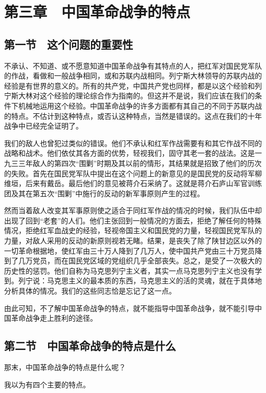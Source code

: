 \section{第三章　中国革命战争的特点}

\subsection{第一节　这个问题的重要性}

不承认、不知道、或不愿意知道中国革命战争有其特点的人，把红军对国民党军队的作战，看做和一般战争相同，或和苏联内战相同。列宁斯大林领导的苏联内战的经验是有世界的意义的。所有的共产党，中国共产党也同样，都是以这个经验和列宁斯大林对这个经验的理论综合作为指南的。但这并不是说，我们应该在我们的条件下机械地运用这个经验。中国革命战争的许多方面都有其自己的不同于苏联内战的特点。不估计到这种特点，或否认这种特点，当然是错误的。这点在我们的十年战争中已经完全证明了。

我们的敌人也曾犯过类似的错误。他们不承认和红军作战需要有和其它作战不同的战略和战术。他们依仗其各方面的优势，轻视我们，固守其老一套的战法。这是一九三三年敌人的第四次“围剿”时期及其以前的情形，其结果就是招致了他们的历次的失败。首先在国民党军队中提出在这个问题上的新意见的是国民党的反动将军柳维垣，后来有戴岳。最后他们的意见被蒋介石采纳了。这就是蒋介石庐山军官训练团及其在第五次“围剿”中施行的反动的新军事原则产生的过程。

然而当着敌人改变其军事原则使之适合于同红军作战的情况的时候，我们队伍中却出现了回到“老套”的人们。他们主张回到一般情况的方面去，拒绝了解任何的特殊情况，拒绝红军血战史的经验，轻视帝国主义和国民党的力量，轻视国民党军队的力量，对敌人采用的反动的新原则视若无睹。结果，是丧失了除了陕甘边区以外的一切革命根据地，使红军由三十万人降到了几万人，使中国共产党由三十万党员降到了几万党员，而在国民党区域的党组织几乎全部丧失。总之，是受了一次极大的历史性的惩罚。他们自称为马克思列宁主义者，其实一点马克思列宁主义也没有学到。列宁说：马克思主义的最本质的东西，马克思主义的活的灵魂，就在于具体地分析具体的情况。我们的这些同志恰是忘记了这一点。

由此可知，不了解中国革命战争的特点，就不能指导中国革命战争，就不能引导中国革命战争走上胜利的途径。

\subsection{第二节　中国革命战争的特点是什么}

那末，中国革命战争的特点是什么呢？

我以为有四个主要的特点。

